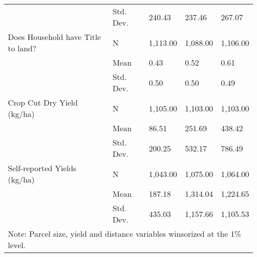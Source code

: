 \begin{table}
\begin{tabular}{lllll}
                             & Std. Dev. &    240.43 &    237.46 &    267.07 \\
Does Household have Title to land? & N &  1,113.00 &  1,088.00 &  1,106.00 \\
                             & Mean &      0.43 &      0.52 &      0.61 \\
                             & Std. Dev. &      0.50 &      0.50 &      0.49 \\
Crop Cut Dry Yield (kg/ha) & N &  1,105.00 &  1,103.00 &  1,103.00 \\
                             & Mean &     86.51 &    251.69 &    438.42 \\
                             & Std. Dev. &    200.25 &    532.17 &    786.49 \\
Self-reported Yields (kg/ha) & N &  1,043.00 &  1,075.00 &  1,064.00 \\
                             & Mean &    187.18 &  1,314.04 &  1,224.65 \\
                             & Std. Dev. &    435.03 &  1,157.66 &  1,105.53 \\
\bottomrule
\multicolumn{6}{l}{Note: Parcel size, yield and distance variables winsorized at the 1\% level.}
\end{tabular}
\end{table}
